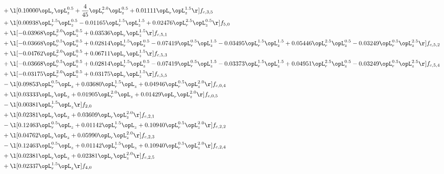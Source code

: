 \begin{alignat}{2}
& + \l[  0.10000 \opL_r \opL_z^{0.5} + \frac{4}{45} \opL_r^{2.0} \opL_z^{0.5} +  0.01111 \opL_r \opL_z^{1.5}  \r] f_{c,3,5} \nonumber \\ 
& + \l[  0.00938 \opL_r^{1.5} \opL_z^{0.5}   -0.01165 \opL_r^{1.5} \opL_z^{1.5} +  0.02476 \opL_r^{2.5} \opL_z^{0.5}  \r] f_{5,0} \nonumber \\ 
& + \l[  -0.03968 \opL_r^{2.0} \opL_z^{0.5} +  0.03536 \opL_r \opL_z^{1.5}  \r] f_{c,5,1} \nonumber \\ 
& + \l[  -0.03668 \opL_r^{0.5} \opL_z^{0.5} +  0.02814 \opL_r^{1.5} \opL_z^{0.5}   -0.07419 \opL_r^{0.5} \opL_z^{1.5}   -0.03495 \opL_r^{1.5} \opL_z^{1.5} +  0.05446 \opL_r^{2.5} \opL_z^{0.5}   -0.03249 \opL_r^{0.5} \opL_z^{2.5}  \r] f_{c,5,2} \nonumber \\ 
& + \l[  -0.04762 \opL_r^{2.0} \opL_z^{0.5} +  0.06711 \opL_r \opL_z^{1.5}  \r] f_{c,5,3} \nonumber \\ 
& + \l[  -0.03668 \opL_r^{0.5} \opL_z^{0.5} +  0.02814 \opL_r^{1.5} \opL_z^{0.5}   -0.07419 \opL_r^{0.5} \opL_z^{1.5}   -0.03373 \opL_r^{1.5} \opL_z^{1.5} +  0.04951 \opL_r^{2.5} \opL_z^{0.5}   -0.03249 \opL_r^{0.5} \opL_z^{2.5}  \r] f_{c,5,4} \nonumber \\ 
& + \l[  -0.03175 \opL_r^{2.0} \opL_z^{0.5} +  0.03175 \opL_r \opL_z^{1.5}  \r] f_{c,5,5} \nonumber \\ 
& - \l[  0.09853 \opL_r^{0.5} \opL_z +  0.03680 \opL_r^{1.5} \opL_z +  0.04946 \opL_r^{0.5} \opL_z^{2.0}  \r] f_{c,0,4} \nonumber \\ 
& + \l[  0.03333 \opL_r \opL_z +  0.01905 \opL_r^{2.0} \opL_z +  0.01429 \opL_r \opL_z^{2.0}  \r] f_{c,0,5} \nonumber \\ 
& - \l[  0.00381 \opL_r^{1.5} \opL_z  \r] f_{2,0} \nonumber \\ 
& + \l[  0.02381 \opL_r \opL_z +  0.03609 \opL_r \opL_z^{2.0}  \r] f_{c,2,1} \nonumber \\ 
& - \l[  0.12463 \opL_r^{0.5} \opL_z +  0.01142 \opL_r^{1.5} \opL_z +  0.10940 \opL_r^{0.5} \opL_z^{2.0}  \r] f_{c,2,2} \nonumber \\ 
& + \l[  0.04762 \opL_r \opL_z +  0.05990 \opL_r \opL_z^{2.0}  \r] f_{c,2,3} \nonumber \\ 
& - \l[  0.12463 \opL_r^{0.5} \opL_z +  0.01142 \opL_r^{1.5} \opL_z +  0.10940 \opL_r^{0.5} \opL_z^{2.0}  \r] f_{c,2,4} \nonumber \\ 
& + \l[  0.02381 \opL_r \opL_z +  0.02381 \opL_r \opL_z^{2.0}  \r] f_{c,2,5} \nonumber \\ 
& + \l[  0.02337 \opL_r^{1.5} \opL_z  \r] f_{4,0} \nonumber \\ 

\end{alignat}
